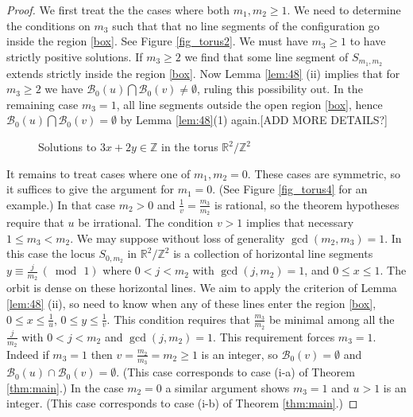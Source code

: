 \documentclass[12pt,letterpaper, reqno]{amsart}
\theoremstyle{definition}
\theoremstyle{remark}
\newcommand{\RR}{\ensuremath{\mathbb{R}}}
\newcommand{\ZZ}{\ensuremath{\mathbb{Z}}}
\newcommand{\sB}{{\mathcal B}}
\begin{document}
\begin{proof}
We first treat the  the cases where both $m_1, m_2 \ge 1$. We  need
to determine the conditions on $m_3$ such that  that no line
segments of the configuration go inside the region \eqref{box}. 
See Figure \ref{fig_torus2}.
We must have $m_3 \ge 1$ to have strictly positive solutions.
If  $m_3 \ge 2$ we find that some  line segment  of $S_{m_1, m_2}$ 
extends strictly inside the region \eqref{box}. Now Lemma \ref{lem:48} (ii) implies
that for $m_3\ge 2$ we have  $\sB_0(u) \bigcap \sB_0(v) \ne \emptyset$,
ruling this possibility out.
In the remaining case  $m_3=1$, 
all line segments outside the  open region \eqref{box},
hence $\sB_0(u) \bigcap \sB_0(v) = \emptyset$
by Lemma \ref{lem:48}(1)  again.[ADD MORE DETAILS?]

\begin{figure}[h]
\begin{center}
\end{center}
\caption{Solutions to $3x+2y\in\ZZ$ in the torus $\RR^2/\ZZ^2$}
\end{figure} \label{fig_torus2}




It remains to treat cases where  one of $m_1, m_2=0$. These cases
are symmetric, so it suffices to give the argument for $m_1=0$.
(See Figure \ref{fig_torus4} for an example.)
In that case $m_2>0$
and  $\frac{1}{v}= \frac{m_3}{m_2}$
is rational, so the theorem hypotheses require that $u$ be irrational. The condition $v>1$ implies that necessary $1 \le m_3 < m_2$.
We may suppose without loss of generality $\gcd(m_2, m_3)=1$.
In this case the locus  $S_{0, m_2}$  in $\RR^2/\ZZ^2$ is a collection of horizontal line
segments  $y \equiv \frac{j}{m_2} \, (\bmod \, 1)$ 
where $0< j< m_2$ with $\gcd(j, m_2)=1$, and $0 \le x \le 1$.
The orbit is dense on these horizontal lines. We 
aim to apply the criterion of Lemma \ref{lem:48} (ii), so need  to know when any of these lines enter
the region \eqref{box}, $0\le x \le \frac{1}{u}, \, 0 \le y \le \frac{1}{v}$. 
This condition 
requires that $\frac{m_3}{m_2}$
be minimal among all the $\frac{j}{m_2}$ with $0< j< m_2$ and $\gcd(j, m_2)=1$.
This requirement forces $m_3=1$. Indeed if $m_3=1$ then $v= \frac{m_2}{m_3} = m_2 \ge 1$
is an integer, so $\sB_0(v) = \emptyset$ and $\sB_0(u)\cap \sB_0(v) = \emptyset.$
(This case corresponds
to case (i-a) of Theorem \ref{thm:main}.) 
In the case $m_2=0$ a similar argument shows $m_3=1$ and 
$u >1$ is an integer. (This case corresponds
to case (i-b) of Theorem \ref{thm:main}.) 
\end{proof} 
\end{document}
